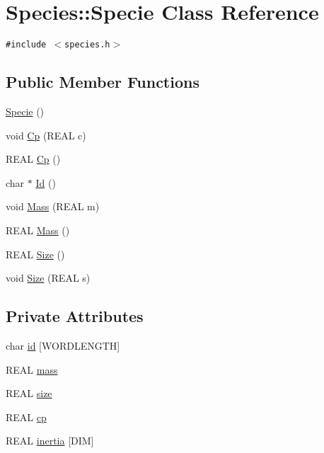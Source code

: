 \hypertarget{classSpecies_1_1Specie}{
\section{Species::Specie Class Reference}
\label{classSpecies_1_1Specie}
}
{\tt \#include $<$species.h$>$}

\subsection*{Public Member Functions}
\begin{CompactItemize}
\item 
\hyperlink{classSpecies_1_1Specie_e2b5a8c985b384598136351ab61f30b6}{Specie} ()
\item 
void \hyperlink{classSpecies_1_1Specie_64b0bc8ca78c0f32a731a954003318d5}{Cp} (REAL c)
\item 
REAL \hyperlink{classSpecies_1_1Specie_0d3ec9a1b51decff3b4725892447d222}{Cp} ()
\item 
char $\ast$ \hyperlink{classSpecies_1_1Specie_85a82dc9d3c0ec3512fb0b2269891c0e}{Id} ()
\item 
void \hyperlink{classSpecies_1_1Specie_7d0beb858e64e8618cdea316c7d3e76b}{Mass} (REAL m)
\item 
REAL \hyperlink{classSpecies_1_1Specie_b852816083703c3b3c193113f582a101}{Mass} ()
\item 
REAL \hyperlink{classSpecies_1_1Specie_f3eb6690f38c15027c0f7b9b5f447732}{Size} ()
\item 
void \hyperlink{classSpecies_1_1Specie_c02d605ca88d4ff258d65d0c8e666d86}{Size} (REAL s)
\end{CompactItemize}
\subsection*{Private Attributes}
\begin{CompactItemize}
\item 
char \hyperlink{classSpecies_1_1Specie_a6bf75e40fc5cc07ae2a91897faebd93}{id} \mbox{[}WORDLENGTH\mbox{]}
\item 
REAL \hyperlink{classSpecies_1_1Specie_301c93ea3dbad326013bcd64d7ea19ab}{mass}
\item 
REAL \hyperlink{classSpecies_1_1Specie_35c31567c4517b068312e15b4539e01f}{size}
\item 
REAL \hyperlink{classSpecies_1_1Specie_b1b4c3bb3bc7fb6f4ffb99872f7d1e2a}{cp}
\item 
REAL \hyperlink{classSpecies_1_1Specie_9cc631ced72a9e28b68f32853b281799}{inertia} \mbox{[}DIM\mbox{]}
\end{CompactItemize}


